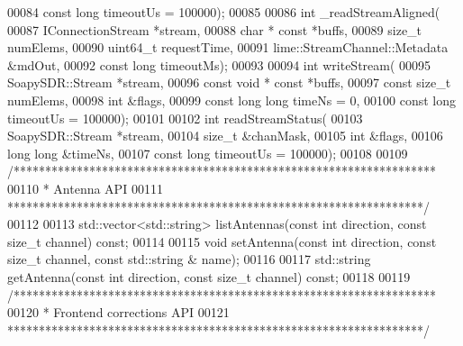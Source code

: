 \begin{DoxyCode}
00084         \textcolor{keyword}{const} \textcolor{keywordtype}{long} timeoutUs = 100000);
00085 
00086     \textcolor{keywordtype}{int} \_readStreamAligned(
00087         IConnectionStream *stream,
00088         \textcolor{keywordtype}{char} * \textcolor{keyword}{const} *buffs,
00089         \textcolor{keywordtype}{size\_t} numElems,
00090         uint64\_t requestTime,
00091         lime::StreamChannel::Metadata &mdOut,
00092         \textcolor{keyword}{const} \textcolor{keywordtype}{long} timeoutMs);
00093 
00094     \textcolor{keywordtype}{int} writeStream(
00095         SoapySDR::Stream *stream,
00096         \textcolor{keyword}{const} \textcolor{keywordtype}{void} * \textcolor{keyword}{const} *buffs,
00097         \textcolor{keyword}{const} \textcolor{keywordtype}{size\_t} numElems,
00098         \textcolor{keywordtype}{int} &flags,
00099         \textcolor{keyword}{const} \textcolor{keywordtype}{long} \textcolor{keywordtype}{long} timeNs = 0,
00100         \textcolor{keyword}{const} \textcolor{keywordtype}{long} timeoutUs = 100000);
00101 
00102     \textcolor{keywordtype}{int} readStreamStatus(
00103         SoapySDR::Stream *stream,
00104         \textcolor{keywordtype}{size\_t} &chanMask,
00105         \textcolor{keywordtype}{int} &flags,
00106         \textcolor{keywordtype}{long} \textcolor{keywordtype}{long} &timeNs,
00107         \textcolor{keyword}{const} \textcolor{keywordtype}{long} timeoutUs = 100000);
00108 
00109     \textcolor{comment}{/*******************************************************************}
00110 \textcolor{comment}{     * Antenna API}
00111 \textcolor{comment}{     ******************************************************************/}
00112 
00113     std::vector<std::string> listAntennas(\textcolor{keyword}{const} \textcolor{keywordtype}{int} direction, \textcolor{keyword}{const} \textcolor{keywordtype}{size\_t} channel) \textcolor{keyword}{const};
00114 
00115     \textcolor{keywordtype}{void} setAntenna(\textcolor{keyword}{const} \textcolor{keywordtype}{int} direction, \textcolor{keyword}{const} \textcolor{keywordtype}{size\_t} channel, \textcolor{keyword}{const} std::string &
      name);
00116 
00117     std::string getAntenna(\textcolor{keyword}{const} \textcolor{keywordtype}{int} direction, \textcolor{keyword}{const} \textcolor{keywordtype}{size\_t} channel) \textcolor{keyword}{const};
00118 
00119     \textcolor{comment}{/*******************************************************************}
00120 \textcolor{comment}{     * Frontend corrections API}
00121 \textcolor{comment}{     ******************************************************************/}

\end{DoxyCode}
